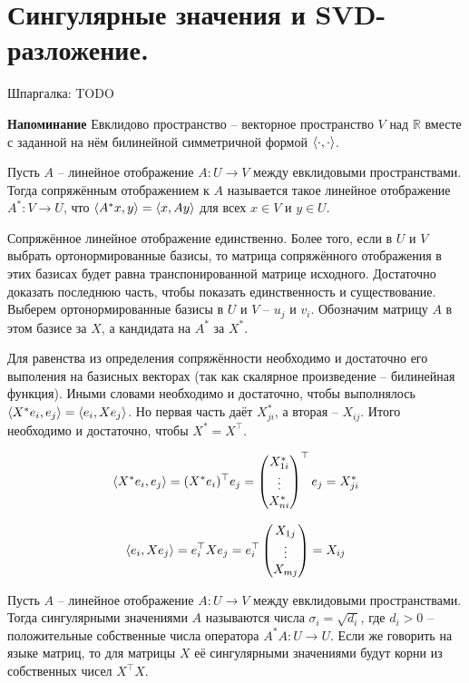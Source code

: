 \section{
Сингулярные значения и SVD-разложение.
}

Шпаргалка: TODO

{\bf Напоминание} Евклидово пространство -- векторное пространство $V$ над $\mathbb{R}$ вместе с заданной на нём билинейной симметричной формой $\left\langle \cdot, \cdot\right\rangle$.

\dfn Пусть $A$ -- линейное отображение $A\colon U \to V$ между евклидовыми пространствами. Тогда сопряжённым отображением к $A$ называется такое линейное отображение $A^{*}\colon V \to U$, что $\left\langle A^*x,y\right\rangle = \left\langle x,Ay\right\rangle$ для всех $x\in V$ и $y \in U$.
\edfn

\thrm Сопряжённое линейное отображение единственно. Более того, если в $U$ и $V$ выбрать ортонормированные базисы, то матрица сопряжённого отображения в этих базисах будет равна транспонированной матрице исходного.
\proof Достаточно доказать последнюю часть, чтобы показать единственность и существование. Выберем ортонормированные базисы в $U$ и $V$ -- $u_j$ и $v_i$. Обозначим матрицу $A$ в этом базисе за $X$, а кандидата на $A^*$ за $X^*$.

Для равенства из определения сопряжённости необходимо и достаточно его выполения на базисных векторах (так как скалярное произведение -- билинейная функция). Иными словами необходимо и достаточно, чтобы выполнялось $\left\langle X^{*}e_i,e_j\right\rangle=\left\langle e_i,Xe_j\right\rangle$. Но первая часть даёт $X^{*}_{ji}$, а вторая -- $X_{ij}$. Итого необходимо и достаточно, чтобы $X^{*}=X^{\top}$.

$$\left\langle X^{*}e_i,e_j\right\rangle=(X^*e_i)^{\top}e_j = \begin{pmatrix} X^*_{1i}\\
 \vdots\\
 X^*_{ni} \end{pmatrix}^{\top}e_j = X^*_{ji}$$
 
 $$\left\langle e_i,Xe_j\right\rangle=e_i^{\top}Xe_j = e_i^{\top}\begin{pmatrix} X_{1j}\\
 \vdots\\
 X_{mj} \end{pmatrix} = X_{ij}$$

\endproof
\ethrm


 Пусть $A$ -- линейное отображение $A\colon U \to V$ между евклидовыми пространствами. Тогда сингулярными значениями $A$ называются числа $\sigma_i=\sqrt{d_i}$, где $d_i>0$ -- положительные собственные числа оператора $A^*A \colon U \to U$. Если же говорить на языке матриц, то для матрицы $X$ её сингулярными значениями будут корни из собственных чисел $X^{\top}X$. 
\edfn

